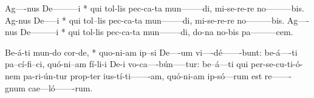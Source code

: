 \documentclass[twoside]{article}
\begin{document}
\begin{gregosheet}
            {   Ag----nus De---------i  * qui tol-lis pec-ca-ta mun--------di,  mi-se-re-re      no---------bis.  Ag-nus De-----i  * qui tol--lis pec-ca-ta mun--------di,  mi-se-re-re      no---------bis.  Ag----nus De---------i  * qui tol-lis pec-ca-ta mun--------di,  do-na no-bis     pa---------cem.}
\end{gregosheet}

\begin{gregosheet}
            {  Be-á-ti  mun-do  cor-de, * quo-ni-am    ip--si   De----um vi----dé-------bunt:  be-á----ti  pa--cí-fi--ci,       quó-ni--am fí-li-i De-i vo-ca----bún-----tur:   be--á---ti      qui per-se-cu-ti-ó-nem pa-ri-ún-tur        prop-ter     ius-tí-ti-------am,    quó-ni-am   ip-só---rum est         re-------gnum cae---ló-------rum.}
\end{gregosheet}
\end{document}

